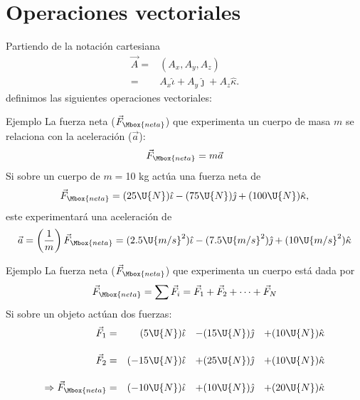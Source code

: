 \section{Operaciones vectoriales}

Partiendo de la notaci\'on cartesiana
\begin{align*}
\vec{A}=&(A_x,A_y,A_z)\\[.35cm]
=&A_x\hat{\iota}+A_y\hat{\jmath}+A_z\hat{\kappa}.
\end{align*}
definimos las siguientes operaciones vectoriales:

\begin{wwteorema}{Ejemplo}
La fuerza neta ($\vec{F}_{\Mbox{neta}}$) que experimenta un cuerpo de masa $m$ se relaciona con la aceleraci\'on ($\vec{a}$): $$\vec{F}_{\Mbox{neta}}=m\vec{a}$$
Si sobre un cuerpo de $m=$10 kg act\'ua una fuerza neta de $$\vec{F}_{\Mbox{neta}}=(25\U{N})\hat{\iota}-(75\U{N})\hat{\jmath}+(100\U{N})\hat{\kappa},$$
este experimentar\'a una aceleraci\'on de 
$$\vec{a}=\left(\frac{1}{m}\right)\vec{F}_{\Mbox{neta}}=(2.5\U{m/s}^2)\hat{\iota}-(7.5\U{m/s}^2)\hat{\jmath}+(10\U{m/s}^2)\hat{\kappa}$$
\end{wwteorema}



\begin{wwteorema}{Ejemplo}
La fuerza neta ($\vec{F}_{\Mbox{neta}}$) que experimenta un cuerpo est\'a dada por 
$$\vec{F}_{\Mbox{neta}}=\sum \vec{F}_i=\vec{F}_1+\vec{F}_2+\cdots + \vec{F}_N$$
Si sobre un objeto act\'uan dos fuerzas:
\begin{align*}
\vec{F}_1&=&(5\U{N})&\hat{\iota}&-&(15\U{N})\hat{\jmath}&+&(10\U{N})\hat{\kappa} \\[.35cm]
\vec{F}_2&=&(-15\U{N})&\hat{\iota}&+&(25\U{N})\hat{\jmath}&+&(10\U{N})\hat{\kappa} \\[.35cm]
\Rightarrow \vec{F}_{\Mbox{neta}}&=&(-10\U{N})&\hat{\iota}&+&(10\U{N})\hat{\jmath}&+&(20\U{N})\hat{\kappa} \\[.35cm]
\end{align*}
\end{wwteorema}

